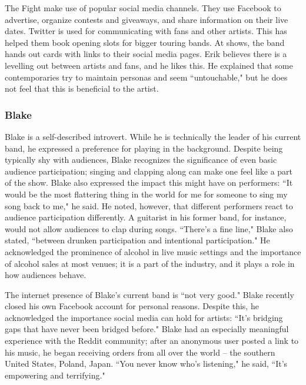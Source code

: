 The Fight make use of popular social media channels. They use Facebook to advertise, organize contests and giveaways, and share information on their live dates. Twitter is used for communicating with fans and other artists. This has helped them book opening slots for bigger touring bands. At shows, the band hands out cards with links to their social media pages. Erik believes there is a levelling out between artists and fans, and he likes this. He explained that some contemporaries try to maintain personas and seem ``untouchable," but he does not feel that this is beneficial to the artist.

\subsubsection{Blake}
Blake is a self-described introvert. While he is technically the leader of his current band, he expressed a preference for playing in the background. Despite being typically shy with audiences, Blake recognizes the significance of even basic audience participation; singing and clapping along can make one feel like a part of the show. Blake also expressed the impact this might have on performers: ``It would be the most flattering thing in the world for me for someone to sing my song back to me," he said. He noted, however, that different performers react to audience participation differently. A guitarist in his former band, for instance, would not allow audiences to clap during songs. ``There's a fine line," Blake also stated, ``between drunken participation and intentional participation." He acknowledged the prominence of alcohol in live music settings and the importance of alcohol sales at most venues; it is a part of the industry, and it plays a role in how audiences behave.

The internet presence of Blake's current band is ``not very good." Blake recently closed his own Facebook account for personal reasons. Despite this, he acknowledged the importance social media can hold for artists: ``It's bridging gaps that have never been bridged before." Blake had an especially meaningful experience with the Reddit community; after an anonymous user posted a link to his music, he began receiving orders from all over the world -- the southern United States, Poland, Japan. ``You never know who's listening," he said, ``It's empowering and terrifying."

